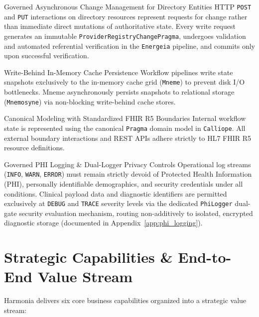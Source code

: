 \begin{principlebox}{Governed Asynchronous Change Management for Directory Entities}
HTTP \texttt{POST} and \texttt{PUT} interactions on directory resources represent requests for change rather than immediate direct mutations of authoritative state. Every write request generates an immutable \texttt{ProviderRegistryChangePragma}, undergoes validation and automated referential verification in the \texttt{Energeia} pipeline, and commits only upon successful verification.
\end{principlebox}

\begin{principlebox}{Write-Behind In-Memory Cache Persistence}
Workflow pipelines write state snapshots exclusively to the in-memory cache grid (\texttt{Mneme}) to prevent disk I/O bottlenecks. Mneme asynchronously persists snapshots to relational storage (\texttt{Mnemosyne}) via non-blocking write-behind cache stores.
\end{principlebox}

\begin{principlebox}{Canonical Modeling with Standardized FHIR R5 Boundaries}
Internal workflow state is represented using the canonical \texttt{Pragma} domain model in \texttt{Calliope}. All external boundary interactions and REST APIs adhere strictly to HL7 FHIR R5 resource definitions.
\end{principlebox}

\begin{principlebox}{Governed PHI Logging \& Dual-Logger Privacy Controls}
Operational log streams (\texttt{INFO}, \texttt{WARN}, \texttt{ERROR}) must remain strictly devoid of Protected Health Information (PHI), personally identifiable demographics, and security credentials under all conditions. Clinical payload data and diagnostic identifiers are permitted exclusively at \texttt{DEBUG} and \texttt{TRACE} severity levels via the dedicated \texttt{PhiLogger} dual-gate security evaluation mechanism, routing non-additively to isolated, encrypted diagnostic storage (documented in Appendix~\ref{app:phi_logging}).
\end{principlebox}

\section{Strategic Capabilities \& End-to-End Value Stream}

Harmonia delivers six core business capabilities organized into a strategic value stream:

